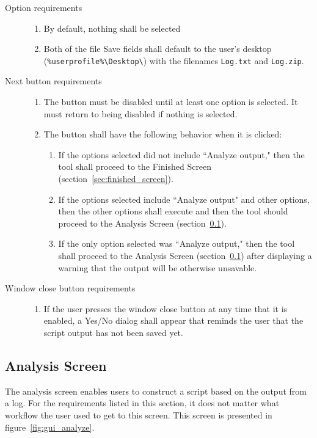 \begin{description}
\item[Option requirements] \hfill
\begin{enumerate}
  \item By default, nothing shall be selected
  \item Both of the file Save fields shall default to the user's desktop
  (\verb|%userprofile%\Desktop\|) with the filenames \verb|Log.txt| and
  \verb|Log.zip|.
\end{enumerate}
\item[Next button requirements] \hfill
\begin{enumerate}
  \item The button must be disabled until at least one option is selected. It
  must return to being disabled if nothing is selected.
  \item The button shall have the following behavior when it is clicked:
  \begin{enumerate}
    \item If the options selected did not include ``Analyze output," then the
    tool shall proceed to the Finished Screen
    (section~\ref{sec:finished_screen}).
    \item If the options selected include ``Analyze output" and other options,
    then the other options shall execute and then the tool should proceed to
    the Analysis Screen (section~\ref{sec:analysis_screen}).
    \item If the only option selected was ``Analyze output," then the tool
    shall proceed to the Analysis Screen (section~\ref{sec:analysis_screen})
    after displaying a warning that the output will be otherwise unsavable.
  \end{enumerate}
\end{enumerate}
\item[Window close button requirements] \hfill
\begin{enumerate}
  \item If the user presses the window close button at any time that it is
  enabled, a Yes/No dialog shall appear that reminds the user that the script
  output has not been saved yet.
\end{enumerate}
\end{description}


\subsection{Analysis Screen} \label{sec:analysis_screen}
The analysis screen enables users to construct a script based on the output
from a log.  For the requirements listed in this section, it does not
matter what workflow the user used to get to this screen.  This screen is
presented in figure~\ref{fig:gui_analyze}.

